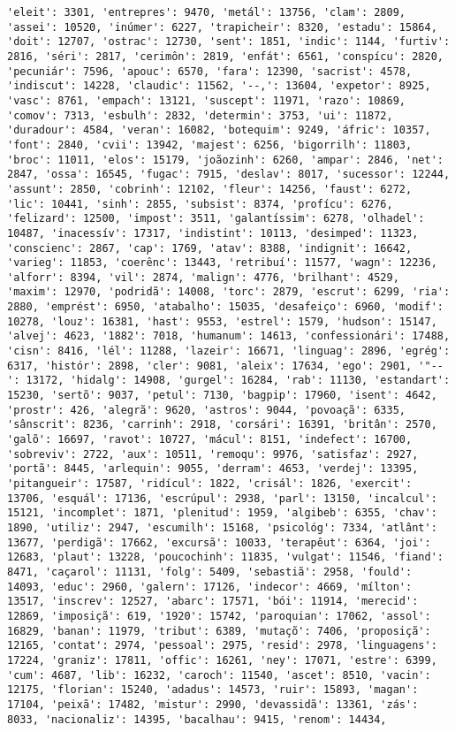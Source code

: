 \documentclass[11pt]{article}
\begin{document}
\begin{Verbatim}[commandchars=\\\{\}]
'eleit': 3301, 'entrepres': 9470, 'metál': 13756, 'clam': 2809, 'assei': 10520, 'inúmer': 6227, 'trapicheir': 8320, 'estadu': 15864, 'doit': 12707, 'ostrac': 12730, 'sent': 1851, 'indic': 1144, 'furtiv': 2816, 'séri': 2817, 'cerimôn': 2819, 'enfát': 6561, 'conspícu': 2820, 'pecuniár': 7596, 'apouc': 6570, 'fara': 12390, 'sacrist': 4578, 'indiscut': 14228, 'claudic': 11562, '--,': 13604, 'expetor': 8925, 'vasc': 8761, 'empach': 13121, 'suscept': 11971, 'razo': 10869, 'comov': 7313, 'esbulh': 2832, 'determin': 3753, 'ui': 11872, 'duradour': 4584, 'veran': 16082, 'botequim': 9249, 'áfric': 10357, 'font': 2840, 'cvii': 13942, 'majest': 6256, 'bigorrilh': 11803, 'broc': 11011, 'elos': 15179, 'joãozinh': 6260, 'ampar': 2846, 'net': 2847, 'ossa': 16545, 'fugac': 7915, 'deslav': 8017, 'sucessor': 12244, 'assunt': 2850, 'cobrinh': 12102, 'fleur': 14256, 'faust': 6272, 'lic': 10441, 'sinh': 2855, 'subsist': 8374, 'profícu': 6276, 'felizard': 12500, 'impost': 3511, 'galantíssim': 6278, 'olhadel': 10487, 'inacessív': 17317, 'indistint': 10113, 'desimped': 11323, 'conscienc': 2867, 'cap': 1769, 'atav': 8388, 'indignit': 16642, 'varieg': 11853, 'coerênc': 13443, 'retribuí': 11577, 'wagn': 12236, 'alforr': 8394, 'vil': 2874, 'malign': 4776, 'brilhant': 4529, 'maxim': 12970, 'podridã': 14008, 'torc': 2879, 'escrut': 6299, 'ria': 2880, 'emprést': 6950, 'atabalho': 15035, 'desafeiço': 6960, 'modif': 10278, 'louz': 16381, 'hast': 9553, 'estrel': 1579, 'hudson': 15147, 'alvej': 4623, '1882': 7018, 'humanum': 14613, 'confessionári': 17488, 'cisn': 8416, 'lél': 11288, 'lazeir': 16671, 'linguag': 2896, 'egrég': 6317, 'histór': 2898, 'cler': 9081, 'aleix': 17634, 'ego': 2901, '"--': 13172, 'hidalg': 14908, 'gurgel': 16284, 'rab': 11130, 'estandart': 15230, 'sertõ': 9037, 'petul': 7130, 'bagpip': 17960, 'isent': 4642, 'prostr': 426, 'alegrã': 9620, 'astros': 9044, 'povoaçã': 6335, 'sânscrit': 8236, 'carrinh': 2918, 'corsári': 16391, 'britân': 2570, 'galõ': 16697, 'ravot': 10727, 'mácul': 8151, 'indefect': 16700, 'sobreviv': 2722, 'aux': 10511, 'remoqu': 9976, 'satisfaz': 2927, 'portã': 8445, 'arlequin': 9055, 'derram': 4653, 'verdej': 13395, 'pitangueir': 17587, 'ridícul': 1822, 'crisál': 1826, 'exercit': 13706, 'esquál': 17136, 'escrúpul': 2938, 'parl': 13150, 'incalcul': 15121, 'incomplet': 1871, 'plenitud': 1959, 'algibeb': 6355, 'chav': 1890, 'utiliz': 2947, 'escumilh': 15168, 'psicológ': 7334, 'atlânt': 13677, 'perdigã': 17662, 'excursã': 10033, 'terapêut': 6364, 'joi': 12683, 'plaut': 13228, 'poucochinh': 11835, 'vulgat': 11546, 'fiand': 8471, 'caçarol': 11131, 'folg': 5409, 'sebastiã': 2958, 'fould': 14093, 'educ': 2960, 'galern': 17126, 'indecor': 4669, 'mílton': 13517, 'inscrev': 12527, 'abarc': 17571, 'bói': 11914, 'merecid': 12869, 'imposiçã': 619, '1920': 15742, 'paroquian': 17062, 'assol': 16829, 'banan': 11979, 'tribut': 6389, 'mutaçõ': 7406, 'proposiçã': 12165, 'contat': 2974, 'pessoal': 2975, 'resid': 2978, 'linguagens': 17224, 'graniz': 17811, 'offic': 16261, 'ney': 17071, 'estre': 6399, 'cum': 4687, 'lib': 16232, 'caroch': 11540, 'ascet': 8510, 'vacin': 12175, 'florian': 15240, 'adadus': 14573, 'ruir': 15893, 'magan': 17104, 'peixã': 17482, 'mistur': 2990, 'devassidã': 13361, 'zás': 8033, 'nacionaliz': 14395, 'bacalhau': 9415, 'renom': 14434, 
\end{Verbatim}
\end{document}
